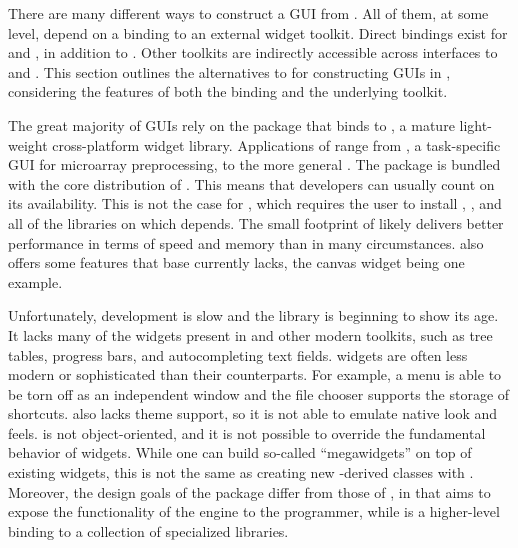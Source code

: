 \documentclass[article,shortnames]{jss}
\begin{document}
There are many different ways to construct a GUI from .
All of them,
at some level, depend on a binding to an external widget toolkit.
Direct bindings
exist for  \citep{ousterhout,welch} and 
\citep{wxwidgets}, 
in addition to . Other toolkits are indirectly accessible
across 
interfaces to  \citep{DCOM} and 
\citep{Java}. 
This section outlines the alternatives to  for
constructing GUIs in , considering the features of both
the
 binding and the underlying toolkit.

The great majority of  GUIs rely on the 
package 
\citep{Rnews:Dalgaard:2001a, Rnews:Dalgaard:2002} that binds 
 to  \citep{ousterhout,welch}, a mature
light-weight cross-platform
widget library. Applications of  range from  
\citep{limma}, a task-specific GUI for microarray preprocessing, to
the more 
general  \citep{rcmndr}. The  package 
is bundled with the core distribution of 
. This means that developers can usually count on its
availability.
This is not the case for , which requires the user
to install , , and all of the libraries on which
depends. The small footprint of  likely delivers better
performance in
terms of speed and memory than  in many circumstances.
also offers some features that base  currently lacks, the
canvas widget
being one example.

Unfortunately,  development is slow and the library is
beginning to show its age. It lacks many of the widgets present in
 and other modern toolkits, such as tree tables, progress
bars, and autocompleting text fields.  widgets are often
less modern or sophisticated than their  counterparts. For
example, a  menu is able to be torn off as an independent
window and the  file chooser supports the storage of
shortcuts.  also lacks theme support, so it is not able to
emulate native look and feels.   is
not object-oriented, and it is not possible to override the
fundamental behavior of widgets.  While one can build so-called
``megawidgets'' on top of existing  widgets, this is not the
same as creating new -derived classes with
. Moreover, the design goals of the  package
differ from those of , in that  aims to expose
the functionality of the  engine to the 
programmer, while  is a higher-level binding to a
collection of specialized  libraries.
\end{document}
